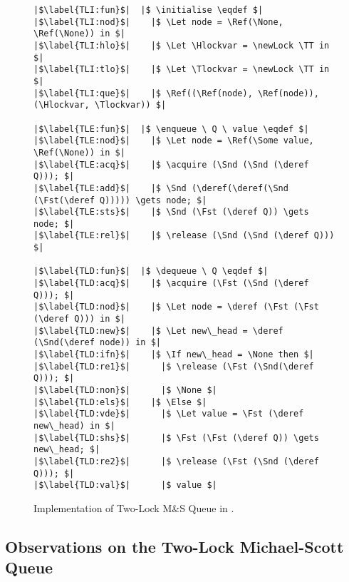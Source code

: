 \documentclass[a4paper, 10pt]{report}
\theoremstyle{definition}
\newcommand{\newLock}{\operatorname{newLock}}
\newcommand{\acquire}{\operatorname{acquire}}
\newcommand{\release}{\operatorname{release}}
\newcommand{\initialise}{\operatorname{initialize}}
\newcommand{\enqueue}{\operatorname{enqueue}}
\newcommand{\dequeue}{\operatorname{dequeue}}
\newcommand{\msq}{M\&S Queue}
\newcommand{\tlmsq}{Two-Lock \msq{}}
\newcommand{\Hlockvar}{H\_lock}
\newcommand{\Tlockvar}{T\_lock}
\begin{document}
\begin{figure}
\begin{verbatim}
|$\label{TLI:fun}$|  |$ \initialise \eqdef $|
|$\label{TLI:nod}$|    |$ \Let node = \Ref(\None, \Ref(\None)) in $|
|$\label{TLI:hlo}$|    |$ \Let \Hlockvar = \newLock \TT in $|
|$\label{TLI:tlo}$|    |$ \Let \Tlockvar = \newLock \TT in $|
|$\label{TLI:que}$|    |$ \Ref((\Ref(node), \Ref(node)), (\Hlockvar, \Tlockvar)) $|

|$\label{TLE:fun}$|  |$ \enqueue \ Q \ value \eqdef $|
|$\label{TLE:nod}$|    |$ \Let node = \Ref(\Some value, \Ref(\None)) in $|
|$\label{TLE:acq}$|    |$ \acquire (\Snd (\Snd (\deref Q))); $|
|$\label{TLE:add}$|    |$ \Snd (\deref(\deref(\Snd (\Fst(\deref Q))))) \gets node; $|
|$\label{TLE:sts}$|    |$ \Snd (\Fst (\deref Q)) \gets node; $|
|$\label{TLE:rel}$|    |$ \release (\Snd (\Snd (\deref Q))) $|

|$\label{TLD:fun}$|  |$ \dequeue \ Q \eqdef $|
|$\label{TLD:acq}$|    |$ \acquire (\Fst (\Snd (\deref Q))); $|
|$\label{TLD:nod}$|    |$ \Let node = \deref (\Fst (\Fst (\deref Q))) in $|
|$\label{TLD:new}$|    |$ \Let new\_head = \deref (\Snd(\deref node)) in $|
|$\label{TLD:ifn}$|    |$ \If new\_head = \None then $|
|$\label{TLD:re1}$|      |$ \release (\Fst (\Snd(\deref Q))); $|
|$\label{TLD:non}$|      |$ \None $|
|$\label{TLD:els}$|    |$ \Else $|
|$\label{TLD:vde}$|      |$ \Let value = \Fst (\deref new\_head) in $|
|$\label{TLD:shs}$|      |$ \Fst (\Fst (\deref Q)) \gets new\_head; $|
|$\label{TLD:re2}$|      |$ \release (\Fst (\Snd (\deref Q))); $|
|$\label{TLD:val}$|      |$ value $|
\end{verbatim}
\caption{Implementation of \tlmsq{} in \heaplang.}
\label{TLMSQ:impl:code}
\end{figure}

\subsection{Observations on the Two-Lock Michael-Scott Queue}
\label{TLMSQ:implementation:sub:observations}
\end{document}
